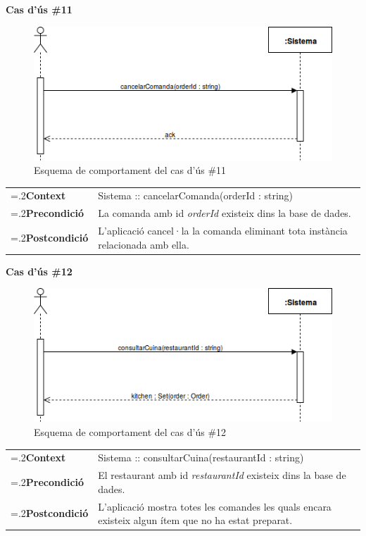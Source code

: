 \clearpage
\noindent\textbf{\large Cas d'ús \#11}\\
\begin{figure}[H]
\centering
\includegraphics[scale=0.6]{Figures/casdus_11.png}
\caption{Esquema de comportament del cas d'ús \#11}
\end{figure}
\begin{table}[h]
\noindent
\begin{tabularx}{\linewidth}{
>{\hsize=.2\hsize}X%
>{\hsize=0.8\hsize}X%
}
\textbf{Context} 		& Sistema :: cancelarComanda(orderId : string) \\
\textbf{Precondició} 	& La comanda amb id \textit{orderId} existeix dins la base de dades. \\
\textbf{Postcondició}	& L'aplicació cancel·la la comanda eliminant tota instància relacionada amb ella. \\
\end{tabularx}
\label{}
\end{table}

\noindent\textbf{\large Cas d'ús \#12}\\
\begin{figure}[H]
\centering
\includegraphics[scale=0.6]{Figures/casdus_12.png}
\caption{Esquema de comportament del cas d'ús \#12}
\end{figure}
\begin{table}[h]
\noindent
\begin{tabularx}{\linewidth}{
>{\hsize=.2\hsize}X%
>{\hsize=0.8\hsize}X%
}
\textbf{Context} 		& Sistema :: consultarCuina(restaurantId : string) \\
\textbf{Precondició} 	& El restaurant amb id \textit{restaurantId} existeix dins la base de dades. \\
\textbf{Postcondició}	& L'aplicació mostra totes les comandes les quals encara existeix algun ítem que no ha estat preparat. \\
\end{tabularx}
\label{}
\end{table}

